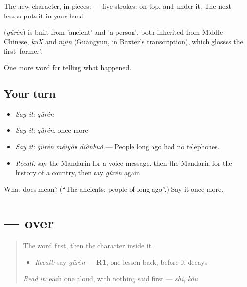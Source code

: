The new character, in pieces:  — five strokes:  on top, and  under it. The next lesson puts it in your hand.

\begin{cousinweb}
\textbf{} (\emph{gǔrén}) is built from  'ancient' and  'a person', both inherited from Middle Chinese, \emph{kuX} and \emph{nyin} (Guangyun, in Baxter's transcription), which glosses the first 'former'.
\end{cousinweb}

\begin{grammarlens}[title={What you've built}]
One more word for telling what happened.
\end{grammarlens}

\subsection*{Your turn}
\begin{itemize}
\raggedright
  \item \emph{Say it:} \emph{gǔrén}
  \item \emph{Say it:} \emph{gǔrén}, once more
  \item \emph{Say it:} \emph{gǔrén méiyǒu diànhuà} — People long ago had no telephones.
  \item \emph{Recall:} say the Mandarin for a voice message, then the Mandarin for the history of a country, then say \emph{gǔrén} again
\end{itemize}

\begin{tcolorbox}[breakable,colback=teal!4,colframe=teal!35!black,title={Before you move on}]
What does  mean? (\textquotedblleft{}The ancients; people of long ago\textquotedblright{}.) Say it once more.
\end{tcolorbox}
\section[\texorpdfstring{\zh{古} (gǔ)}{古 (gǔ)}]{ —  over }

\label{lesson:ZH-W321-gu-ancient}



\begin{quote}
The word first, then the character inside it.

\begin{itemize}
\raggedright
  \item \emph{Recall:} say \emph{gǔrén} — \textbf{R1}, one lesson back, before it decays
\end{itemize}

\begin{quote}
 
\end{quote}

\emph{Read it:} each one aloud, with nothing said first — \emph{shí}, \emph{kǒu}
\end{quote}

